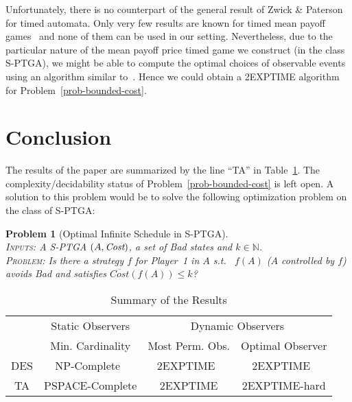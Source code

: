 \documentclass[letterpaper,10pt,conference]{ieeeconf}  \IEEEoverridecommandlockouts                              \overrideIEEEmargins
\def\st{{s.t.}~}
\newtheorem{prob}{Problem}  \newtheorem{definition}{Definition}
\newcommand{\setN}{\mathbb N}
\def\Cost{\textit{Cost}}
\def\MeanCost{\textit{$\overline{\Cost}$}}
\begin{document}
Unfortunately, there is no counterpart of the general result of Zwick
\& Paterson for timed automata.  Only very few results are known for
timed mean payoff
games~\cite{BLMR-fsttcs2006,bflms-formats08,bbjlr-formats08,BFLM-hscc10}
and none of them can be used in our setting.  Nevertheless, due to the
particular nature of the mean payoff price timed game we construct (in
the class S-PTGA), we might be able to compute the optimal choices of
observable events using an algorithm similar to~\cite{BBL-fmsd06}.
Hence we could obtain a 2EXPTIME algorithm for
Problem~\ref{prob-bounded-cost}.


\section{Conclusion}\label{sec-conclu}



The results of the paper are summarized by the line ``TA'' in
Table~\ref{tab-summary}.  The complexity/decidability status of
Problem~\ref{prob-bounded-cost} is left open.  A solution to this
problem would be to solve the following optimization problem on the
class of S-PTGA:
\begin{prob}[Optimal Infinite Schedule in S-PTGA] \mbox{}\\
  \textsc{Inputs:} A S-PTGA $(A,\textit{Cost})$, a set of \emph{Bad} states and $k \in \setN$.\\
  \textsc{Problem:} Is there a strategy $f$ for Player~1 in $A$ \st
  $f(A)$ ($A$ controlled by $f$) avoids \emph{Bad} and satisfies $\MeanCost(f(A)) \leq k$?
\end{prob}

\newcommand{\vtab}[1]{
  \begin{tabular}[c]{c}
    #1
  \end{tabular}
}
\begin{table}[t]
  \centering
  \caption{Summary of the Results}
  \label{tab-summary}
  \begin{tabular}[t]{||c|c|c|c||}\hline\hline
    &  Static Observers   & \multicolumn{2}{c||}{Dynamic Observers} \\\cline{3-4}
    &  Min. Cardinality   & Most Perm. Obs. & Optimal Observer \\\hline\hline
    DES & NP-Complete~\cite{cassez-acsd-07} & 2EXPTIME~\cite{cassez-acsd-07} & 2EXPTIME~\cite{cassez-tase-07}   \\\hline
    TA & PSPACE-Complete & 2EXPTIME  &  2EXPTIME-hard \\\hline\hline
  \end{tabular}
\end{table}
\end{document}
